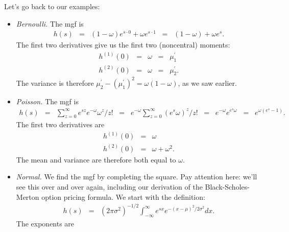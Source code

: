 \documentclass[11pt]{article}
\begin{document}
Let's go back to our examples:
%
\begin{itemize}
\item {\it Bernoulli.\/}
The mgf is
\begin{eqnarray*}
    h(s) &=& (1-\omega) e^{s \cdot 0} + \omega e^{s \cdot 1}
        \;\;=\;\; (1-\omega) + \omega e^{s} .
\end{eqnarray*}
The first two derivatives give us the first two (noncentral) moments:
\begin{eqnarray*}
    h^{(1)}(0) &=& \omega \;\;=\;\; \mu_1^\prime \\
    h^{(2)}(0) &=& \omega \;\;=\;\; \mu_2^\prime.
\end{eqnarray*}
The variance is therefore $\mu_2^\prime - (\mu_1^\prime)^2 = \omega (1-\omega)$, as we saw earlier.

\item {\it Poisson.\/}  The mgf is
\begin{eqnarray*}
    h(s) &=& \sum_{z=0}^\infty e^{sz} e^{-\omega} \omega^z/z!
            \;\;=\;\; e^{-\omega} \sum_{z=0}^\infty \left( e^{s} \omega\right)^z /z!
            \;\;=\;\; e^{-\omega} e^{e^{s} \omega}
            \;\;=\;\; e^{\omega (e^{s}-1)}  .
\end{eqnarray*}
The first two derivatives are
\begin{eqnarray*}
    h^{(1)}(0) &=& \omega  \\
    h^{(2)}(0) &=& \omega + \omega^2 .
\end{eqnarray*}
The mean and variance are therefore both equal to $\omega$.

\item {\it Normal.\/}
We find the mgf by completing the square.
Pay attention here:  we'll see this over and over again, including our derivation
of the Black-Scholes-Merton option pricing formula.
We start with the definition:
\begin{eqnarray*}
        h(s) &=& (2\pi \sigma^2)^{-1/2} \int_{-\infty}^\infty e^{sx} e^{-(x-\mu)^2/2\sigma^2} dx .
\end{eqnarray*}
The exponents are

\smallskip
\newlength{\oldfrule}
\setlength{\oldfrule}{\fboxrule}
\setlength{\fboxrule}{3\fboxrule}
\newlength{\boxwidth}
\setlength{\boxwidth}{\textwidth}
\addtolength{\boxwidth}{-2\fboxsep}
\addtolength{\boxwidth}{-2\fboxrule}
\noindent
{}
\setlength{\fboxrule}{\oldfrule}


\end{itemize}
\end{document}
